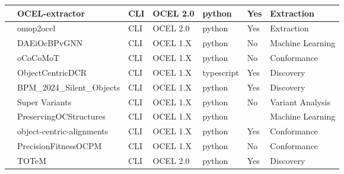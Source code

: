 \begin{table}
\begin{tabular}{|l|p{4cm}|l|p{2cm}|l|l|p{4.5cm}|}
		\cite{textmining}         & OCEL-extractor                   & CLI          & OCEL 2.0             & python              & Yes         & Extraction                                             \\ \hline
		\cite{omop}               & omop2ocel                        & CLI          & OCEL 2.0             & python              & Yes         & Extraction                                             \\ \hline
		\cite{graphnn}            & DAEiOcBPvGNN                     & CLI          & OCEL 1.X             & python              & No          & Machine Learning                                       \\ \hline
		\cite{ococomot}           & oCoCoMoT                         & CLI          & OCEL 1.X             & python              & No          & Conformance                                            \\ \hline
		\cite{ocdm}               & ObjectCentricDCR                 & CLI          & OCEL 1.X             & typescript          & Yes         & Discovery                                              \\ \hline
		\cite{silentobjects}      & BPM\_2024\_Silent\_Objects       & CLI          & OCEL 1.X             & python              & Yes         & Discovery                                              \\ \hline
		\cite{supervariants}      & Super Variants                   & CLI          & OCEL 1.X             & python              & No          & Variant Analysis                                       \\ \hline
		\cite{mmlpm}              & PreservingOCStructures           & CLI          & OCEL 1.X             & python              & ~           & Machine Learning                                       \\ \hline
		\cite{alignments}         & object-centric-alignments        & CLI          & OCEL 1.X             & python              & Yes         & Conformance                                            \\ \hline
		\cite{precfit}            & PrecisionFitnessOCPM             & CLI          & OCEL 1.X             & python              & No          & Conformance                                            \\ \hline
		\cite{totem}              & TOTeM                            & CLI          & OCEL 2.0             & python              & Yes         & Discovery                                              \\ \hline
	\end{tabular}
\end{table}

